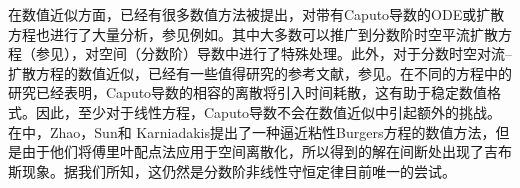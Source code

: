 在数值近似方面，已经有很多数值方法被提出，对带有Caputo导数的ODE或扩散方程也进行了大量分析，参见例如。其中大多数可以推广到分数阶时空平流扩散方程（参见），对空间（分数阶）导数中进行了特殊处理。此外，对于分数时空对流--扩散方程的数值近似，已经有一些值得研究的参考文献，参见。在不同的方程中的研究已经表明，Caputo导数的相容的离散将引入时间耗散，这有助于稳定数值格式。因此，至少对于线性方程，Caputo导数不会在数值近似中引起额外的挑战。在中，Zhao，Sun和 Karniadakis提出了一种逼近粘性Burgers方程的数值方法，但是由于他们将傅里叶配点法应用于空间离散化，所以得到的解在间断处出现了吉布斯现象。据我们所知，这仍然是分数阶非线性守恒定律目前唯一的尝试。

